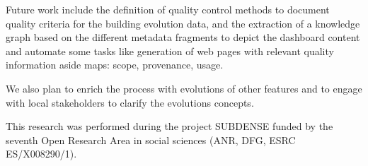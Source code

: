 \documentclass[agile, final]{copernicus-agile}
\begin{document}
\conclusions[Perspectives]

Future work include the definition of quality control methods to document quality criteria for the building evolution data, and the extraction of a knowledge graph based on the different metadata fragments to depict the dashboard content and automate some tasks like generation of web pages with relevant quality information aside maps: scope, provenance, usage.    

We also plan to enrich the process with evolutions of other features and to engage with local stakeholders to clarify the evolutions concepts.

\begin{acknowledgements}
This research was performed during the project SUBDENSE funded by the seventh Open Research Area in social sciences (ANR, DFG, ESRC ES/X008290/1).
\end{acknowledgements}














\end{document}
